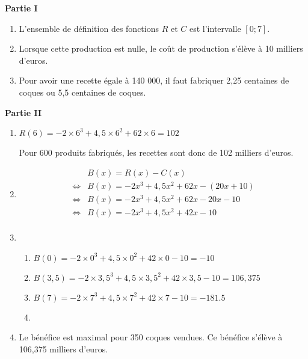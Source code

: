 \documentclass[a4paper]{article}
\renewcommand\euro{\officialeuro\xspace}
\begin{document}
    \begin{exercice}{}{}
    
      {\bf Partie I}
    \begin{enumerate}
      \item L'ensemble de définition des fonctions $R$ et $C$ est l'intervalle $[0 ; 7]$.
      \item Lorsque cette production est nulle, le coût de production s'élève à 10 milliers d'euros.
      \item Pour avoir une recette égale à 140 000\euro{}, il faut fabriquer 2,25 centaines de coques ou 5,5 centaines de coques.
    \end{enumerate}


    {\bf Partie II}

    \begin{enumerate}
      \item  $R(6) = -2 \times 6^3 + 4,5 \times 6^2 + 62 \times 6 = 102$
      
      Pour 600 produits fabriqués, les recettes sont donc de 102 milliers d'euros.

      \item 
      \begin{align*}
        &B(x) = R(x) - C(x)\\
      \iff & B(x) = -2x^3 +4,5x^2 +62x -(20x+10) \\
      \iff & B(x) = -2x^3 + 4,5x^2 + 62x - 20x -10 \\
      \iff & B(x) = -2x^3 + 4,5x^2 +42x -10\\
      \end{align*}
      \item \begin{enumerate}
        \item $B(0) =  -2 \times 0^3 + 4,5 \times 0^2 + 42 \times 0 - 10 = -10$
        \item $B(3,5) = -2 \times 3,5^3 + 4,5 \times 3,5^2 + 42 \times 3,5 - 10 = 106,375$
        \item $B(7) = -2 \times 7^3 + 4,5 \times 7^2 + 42 \times 7 - 10 = -181.5$
        \item {}

     
      \end{enumerate}
      \item Le bénéfice est maximal pour 350 coques vendues. Ce bénéfice s'élève à 106,375 milliers d'euros.

    \end{enumerate}
    \end{exercice}
\end{document}
